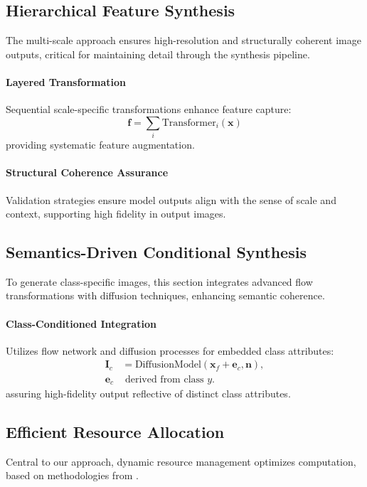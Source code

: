 \documentclass{article} %
\begin{document}
\subsection{Hierarchical Feature Synthesis}
The multi-scale approach ensures high-resolution and structurally coherent image outputs, critical for maintaining detail through the synthesis pipeline.

\paragraph{Layered Transformation}
Sequential scale-specific transformations enhance feature capture:
\begin{equation}
\mathbf{f} = \sum_{i}\text{Transformer}_{i}(\mathbf{x})
\end{equation}
providing systematic feature augmentation.

\paragraph{Structural Coherence Assurance}
Validation strategies ensure model outputs align with the sense of scale and context, supporting high fidelity in output images.

\subsection{Semantics-Driven Conditional Synthesis}
To generate class-specific images, this section integrates advanced flow transformations with diffusion techniques, enhancing semantic coherence.

\paragraph{Class-Conditioned Integration}
Utilizes flow network and diffusion processes for embedded class attributes:
\begin{align}
\mathbf{I}_c &= \text{DiffusionModel}(\mathbf{x}_f + \mathbf{e}_c, \mathbf{n}),\\
\mathbf{e}_c &\text{ derived from class } y.
\end{align}
assuring high-fidelity output reflective of distinct class attributes.

\subsection{Efficient Resource Allocation}
Central to our approach, dynamic resource management optimizes computation, based on methodologies from \citep{Vincent2011}.
\end{document}
